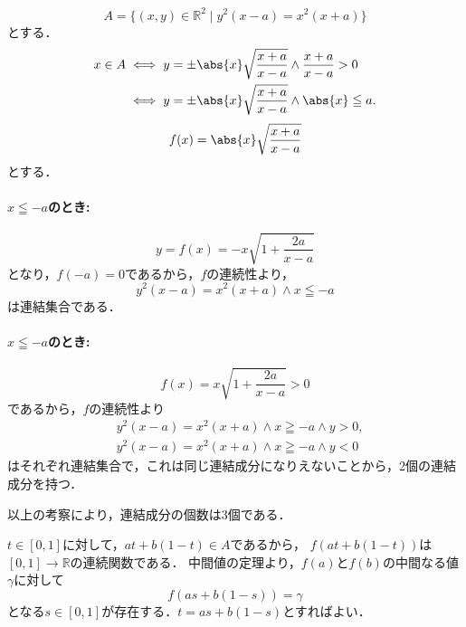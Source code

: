 
\begin{tanswer}
    \[
        A = \{ (x,y) \in \mathbb{R}^2 \mid y^2(x-a)=x^2(x+a) \}
    \]
    とする．
    \begin{align*}
        x \in A & \iff y= \pm \abs{x}\sqrt{\frac{x+a}{x-a}} \land \frac{x+a}{x-a} >0 \\
                & \iff y= \pm \abs{x}\sqrt{\frac{x+a}{x-a}} \land \abs{x} \leqq a .
    \end{align*}
    \[
        f(x)=\abs{x}\sqrt{\frac{x+a}{x-a}}
    \]
    とする．

    \paragraph{$x \leqq -a$のとき:}
    \[
        y=f(x)=-x \sqrt{1+\frac{2a}{x-a}}
    \]
    となり，$f(-a)=0$であるから，$f$の連続性より，
    \[
        y^2(x-a)=x^2(x+a) \land x \leqq -a
    \]
    は連結集合である．

    \paragraph{$x \leqq -a$のとき:}
    \[
        f(x)=x \sqrt{1+\frac{2a}{x-a}} >0
    \]
    であるから，$f$の連続性より
    \begin{align*}
         & y^2(x-a)=x^2(x+a) \land x \geqq -a \land y >0 , \\
         & y^2(x-a)=x^2(x+a) \land x \geqq -a \land y <0
    \end{align*}
    はそれぞれ連結集合で，これは同じ連結成分になりえないことから，2個の連結成分を持つ．

    以上の考察により，連結成分の個数は3個である．
\end{tanswer}


\begin{tproof}
    $ t \in [0,1]$に対して，$at +b(1-t) \in A$であるから，
    $f(at +b(1-t))$は$[0,1] \longrightarrow \mathbb{R}$の連続関数である．
    中間値の定理より，$f(a)$と$f(b)$の中間なる値$\gamma$に対して
    \[
        f(as +b(1-s)) = \gamma
    \]
    となる$s \in [0,1]$が存在する．$t=as+b(1-s)$とすればよい．
\end{tproof}
